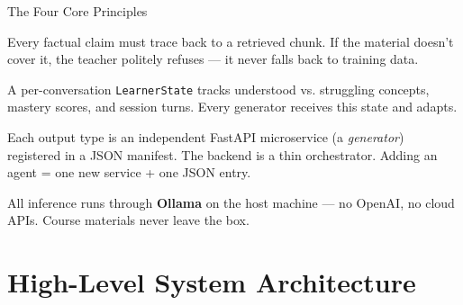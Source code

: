 \documentclass[aspectratio=169, 10pt]{beamer}
\begin{document}
\begin{frame}{The Four Core Principles}
  \begin{tcolorbox}[colback=eduLightBlue, colframe=eduBlue, title=\textbf{1. Strict Grounding}]
    Every factual claim must trace back to a retrieved chunk. If the
    material doesn't cover it, the teacher politely refuses --- it never
    falls back to training data.
  \end{tcolorbox}

  \begin{tcolorbox}[colback=eduLightGreen, colframe=eduGreen, title=\textbf{2. Learner-Aware}]
    A per-conversation \texttt{LearnerState} tracks understood vs.
    struggling concepts, mastery scores, and session turns.
    Every generator receives this state and adapts.
  \end{tcolorbox}

  \begin{tcolorbox}[colback=eduPurple!10, colframe=eduPurple, title=\textbf{3. Multi-Agent / Plugin Architecture}]
    Each output type is an independent FastAPI microservice (a
    \textit{generator}) registered in a JSON manifest. The backend is a
    thin orchestrator. Adding an agent = one new service + one JSON entry.
  \end{tcolorbox}

  \begin{tcolorbox}[colback=eduLightOrange, colframe=eduOrange, title=\textbf{4. Fully Local LLM}]
    All inference runs through \textbf{Ollama} on the host machine ---
    no OpenAI, no cloud APIs. Course materials never leave the box.
  \end{tcolorbox}
\end{frame}

\section{High-Level System Architecture}
\end{document}
